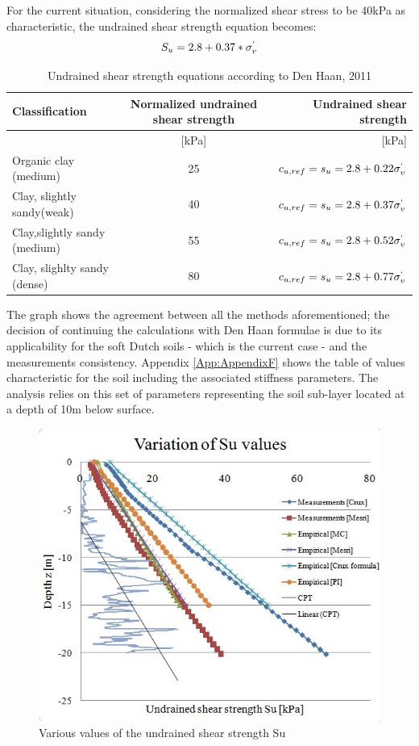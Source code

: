 \documentclass[12pt,a4paper]{report}
\begin{document}
For the current situation, considering the normalized shear stress to be 40kPa as characteristic, the undrained shear strength equation becomes:
\begin{equation}
	S_u=2.8+0.37*\sigma^`_v
\end{equation}

\begin{table}[h!]
	\centering
	\begin{tabular}{|l|c|r|}
		\hline Classification       &      Normalized undrained shear strength   &  Undrained shear strength\\
		\hline [-]  &  [kPa]  & [kPa]   \\ 
		\hline Organic clay (medium)    & 25 &  $c_{u,ref} =s_u=2.8+0.22\sigma^`_v$ \\ 
		\hline Clay, slightly sandy(weak)  & 40  &   $c_{u,ref} =s_u=2.8+0.37\sigma^`_v$   \\ 
		\hline Clay,slightly sandy (medium) &  55  &  $c_{u,ref} =s_u=2.8+0.52\sigma^`_v$     \\ 
		\hline Clay, slighlty sandy (dense) & 80  &  $c_{u,ref} =s_u=2.8+0.77\sigma^`_v$     \\ 
		\hline
	\end{tabular}

	\caption{Undrained shear strength equations according to Den Haan, 2011 \cite{den2011ongedraineerde}}
	\label{DenHaan_param}
\end{table}

The graph shows the agreement between all the methods aforementioned; the decision of continuing the calculations with Den Haan \cite{den2011ongedraineerde} formulae is due to its applicability for the soft Dutch soils - which is the current case - and the measurements consistency. Appendix \ref{App:AppendixF} shows the table of values characteristic for the soil including the associated stiffness parameters. The analysis relies on this set of parameters representing the soil sub-layer located at a depth of 10m below surface.

\begin{figure}[h!]
	\centering
	\includegraphics[width=0.7\linewidth]{"Su"}
	\caption{Various values of the undrained shear strength Su}
	\label{Su}
\end{figure}
\end{document}
